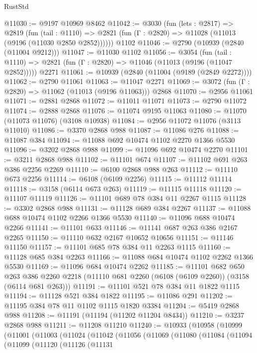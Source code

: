 \begin{lexlean}{RustStd}
\begin{coremodule}
{\begin{coremodule}
{{{{{{{{{{{{{{{{{{{{{{{{{{@11030 := @9197 @10969 @8462
@11042 := @3030
    (fun (lets : @2817) =>
    @2819
      (fun (tail : @1110) =>
      @2821 (fun (Γ : @2820) => @11028 (@11013 (@9196 (@11030 @2850 @2852))))))
    @1102
@11046 := @2790 (@10939 (@2840 (@11004 @9212)))
@11047 := @11030 @1102
@11056 := @3054
    (fun (tail : @1110) => @2821 (fun (Γ : @2820) => @11046 (@11013 (@9196 (@11047 @2852)))))
    @2271
@11061 := @10939 (@2840 (@11004 (@9189 (@2849 @2272))))
@11062 := @2790 @11061
@11063 := @11047 @2271
@11069 := @3072 (fun (Γ : @2820) => @11062 (@11013 (@9196 @11063))) @2868
@11070 := @2956 @11061
@11071 := @2881 @2868
@11072 := @11011 @11071
@11073 := @2790 @11072
@11074 := @2888 @2868
@11076 := @11074 @9195 @11063
@11080 := @11070 (@11073 @11076) (@3108 @10938)
@11084 := @2956 @11072 @11076 (@3113 @11010)
@11086 := @3370 @2868 @988
@11087 := @11086 @276
@11088 := @11087 @384
@11094 := @11088 @692 @10474 @1102 @2270 @1366 @5530
@11096 := @3202 @2868 @988
@11099 := @11096 @692 @10474 @2270
@11101 := @3211 @2868 @988
@11102 := @11101 @674
@11107 := @11102 @691 @263 @386 @2256 @2269
@11110 := @6100 @2868 @988 @263
@11112 := @11110 @673 @2256
@11114 := @6108 (@6109 @2256)
@11115 := @11112 @11114
@11118 := @3158 (@6114 @673 @263)
@11119 := @11115 @11118
@11120 := @11107 @11119
@11126 := @11101 @689 @78 @384 @11 @2267 @1115
@11128 := @3302 @2868 @988
@11131 := @11128 @689 @384 @2267
@11137 := @11088 @688 @10474 @1102 @2266 @1366 @5530
@11140 := @11096 @688 @10474 @2266
@11141 := @11101 @633
@11146 := @11141 @687 @263 @386 @2167 @2265
@11150 := @11110 @632 @2167 @10652 @10656
@11151 := @11146 @11150
@11157 := @11101 @685 @78 @384 @11 @2263 @1115
@11160 := @11128 @685 @384 @2263
@11166 := @11088 @684 @10474 @1102 @2262 @1366 @5530
@11169 := @11096 @684 @10474 @2262
@11185 := @11101
    @682
    @650
    @263
    @386
    @2260
    @2218
    (@11110 @681 @2260 (@6108 (@6109 @2260)) (@3158 (@6114 @681 @263)))
@11191 := @11101 @521 @78 @384 @11 @1822 @1115
@11194 := @11128 @521 @384 @1822
@11195 := @11086 @291
@11202 := @11195 @384 @78 @11 @1102 @1115 @1820 @3384
@11204 := @5419 @2868 @988
@11208 := @11191 (@11194 (@11202 @11204 @8434))
@11210 := @3237 @2868 @988
@11211 := @11208 @11210
@11240 := @10933
    (@10958
      (@10999
        (@11001
          (@11003
            (@11024
              (@11042
                (@11056
                  (@11069
                    (@11080
                      (@11084
                        (@11094
                          (@11099
                            (@11120
                              (@11126
                                (@11131
}}}}}}}}}}}}}}}}}}}}}}}}}}
\end{coremodule}}
\end{coremodule}
\end{lexlean}
